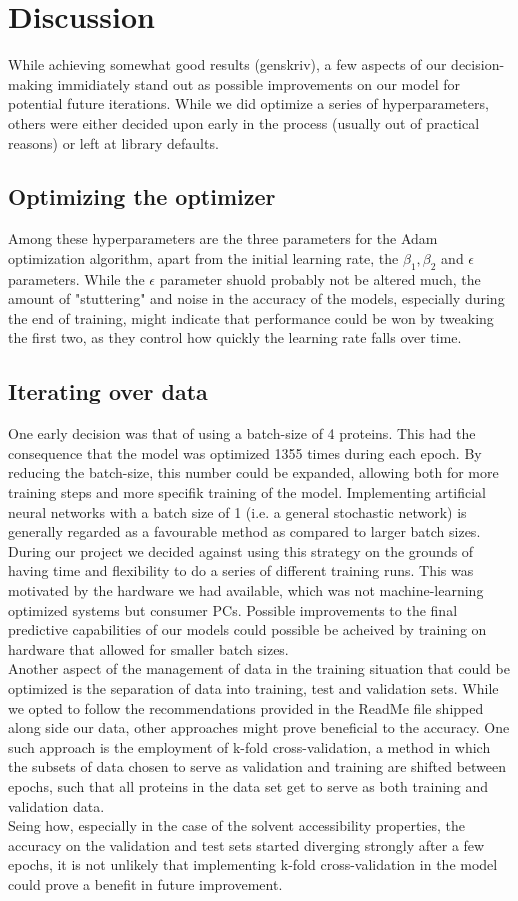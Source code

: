 \section{Discussion}
While achieving somewhat good results (genskriv), a few aspects of our decision-making immidiately stand out as possible improvements on our model for potential future iterations. While we did optimize a series of hyperparameters, others were either decided upon early in the process (usually out of practical reasons) or left at library defaults.
\subsection{Optimizing the optimizer}
Among these hyperparameters are the three parameters for the Adam optimization algorithm, apart from the initial learning rate, the $\beta_1, \beta_2$ and $\epsilon$ parameters. While the $\epsilon$ parameter shuold probably not be altered much, the amount of "stuttering" and noise in the accuracy of the models, especially during the end of training, might indicate that performance could be won by tweaking the first two, as they control how quickly the learning rate falls over time.
\subsection{Iterating over data}
One early decision was that of using a batch-size of 4 proteins. This had the consequence that the model was optimized 1355 times during each epoch. By reducing the batch-size, this number could be expanded, allowing both for more training steps and more specifik training of the model. Implementing artificial neural networks with a batch size of 1 (i.e. a general stochastic network) is generally regarded as a favourable method as compared to larger batch sizes.\\
During our project we decided against using this strategy on the grounds of having time and flexibility to do a series of different training runs. This was motivated by the hardware we had available, which was not machine-learning optimized systems but consumer PCs. Possible improvements to the final predictive capabilities of our models could possible be acheived by training on hardware that allowed for smaller batch sizes.\\
Another aspect of the management of data in the training situation that could be optimized is the separation of data into training, test and validation sets. While we opted to follow the recommendations provided in the ReadMe file shipped along side our data, other approaches might prove beneficial to the accuracy. One such approach is the employment of k-fold cross-validation, a method in which the subsets of data chosen to serve as validation and training  are shifted between epochs, such that all proteins in the data set get to serve as both training and validation data.\\
Seing how, especially in the case of the solvent accessibility properties, the accuracy on the validation and test sets started diverging strongly after a few epochs, it is not unlikely that implementing k-fold cross-validation in the model could prove a benefit in future improvement.


